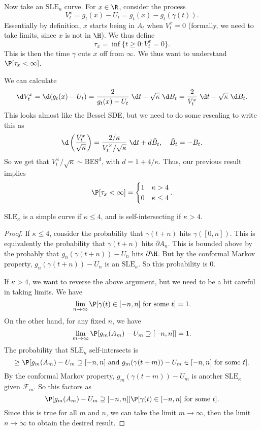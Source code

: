 \documentclass[a4paper]{article}
\newcommand\SLE{\mathrm{SLE}}
\newcommand\BES{\mathrm{BES}}
\begin{document}
Now take an $\SLE_\kappa$ curve. For $x \in \R$, consider the process
\[
  V_t^x = g_t(x) - U_t = g_t(x) - g_t(\gamma(t)).
\]
Essentially by definition, $x$ starts being in $A_t$ when $V_t^x = 0$ (formally, we need to take limits, since $x$ is not in $\H$). We thus define
\[
  \tau_x = \inf \{t \geq 0: V_t^x = 0\}.
\]
This is then the time $\gamma$ cuts $x$ off from $\infty$. We thus want to understand $\P[\tau_x < \infty]$.

We can calculate
\[
  \d V_t^x = \d (g_t(x) - U_t) = \frac{2}{g_t(x) - U_t}\;\d t - \sqrt{\kappa} \;\d B_t = \frac{2}{V_t^x}\;\d t - \sqrt{\kappa}\;\d B_t.
\]
This looks almost like the Bessel SDE, but we need to do some rescaling to write this as
\[
  \d \left(\frac{V_t^x}{\sqrt{\kappa}}\right) = \frac{2/\kappa}{V_t^\times/\sqrt{\kappa}} \;\d t + d \tilde{B}_t,\quad \tilde{B}_t = - B_t.
\]
So we get that $V_t^\times/\sqrt{\kappa} \sim \BES^d$, with $d = 1 + 4/\kappa$. Thus, our previous result implies
\[
  \P[\tau_x < \infty] =
  \begin{cases}
    1 & \kappa > 4\\
    0 & \kappa \leq 4
  \end{cases}.
\]
\begin{thm}
  $\SLE_\kappa$ is a simple curve if $\kappa \leq 4$, and is self-intersecting if $\kappa > 4$.
\end{thm}

\begin{proof}
  If $\kappa \leq 4$, consider the probability that $\gamma(t + n)$ hits $\gamma([0, n])$. This is equivalently the probability that $\gamma(t + n)$ hits $\partial A_n$. This is bounded above by the probably that $g_n(\gamma(t + n)) - U_n$ hits $\partial \H$. But by the conformal Markov property, $g_n(\gamma(t + n)) - U_n$ is an $\SLE_\kappa$. So this probability is $0$.

  If $\kappa > 4$, we want to reverse the above argument, but we need to be a bit careful in taking limits. We have
  \[
    \lim_{n \to \infty} \P[\gamma(t) \in [-n, n]\text{ for some }t] = 1.
  \]
  On the other hand, for any fixed $n$, we have
  \[
    \lim_{m \to \infty} \P[g_m(A_m) - U_m \supseteq [-n, n]] = 1.
  \]
  The probability that $\SLE_\kappa$ self-intersects is
  \[
    \geq \P[g_m(A_m) - U_m \supseteq [-n, n]\text{ and } g_m(\gamma(t + m)) - U_m \in [-n, n]\text{ for some }t].
  \]
  By the conformal Markov property, $g_m(\gamma(t + m)) - U_m$ is another $\SLE_\kappa$ given $\mathcal{F}_m$. So this factors as
  \[
    \P[g_m (A_m) - U_m \supseteq [-n, n]] \P[\gamma(t) \in [-n, n]\text{ for some }t].
  \]
  Since this is true for all $m$ and $n$, we can take the limit $m \to \infty$, then the limit $n \to \infty$ to obtain the desired result.
\end{proof}
\end{document}

